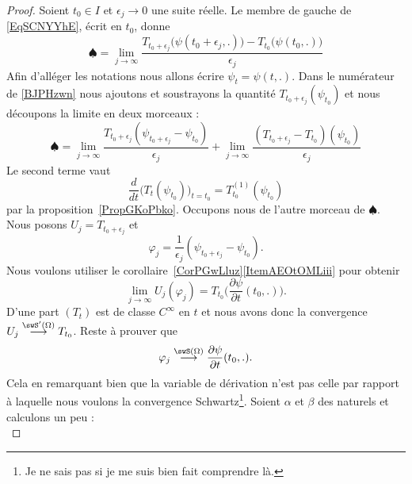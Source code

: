 \begin{proof}
    Soient \( t_0\in I\) et \( \epsilon_j\to 0\) une suite réelle. Le membre de gauche de \eqref{EqSCNYYhE}, écrit en \( t_0\), donne
    \begin{equation}    \label{BJPHzwn}
        \spadesuit=\lim_{j\to \infty} \frac{ T_{t_0+\epsilon_j}\big( \psi(t_0+\epsilon_j,.) \big)-T_{t_0}\big( \psi(t_0,.) \big) }{ \epsilon_j }
    \end{equation}
    Afin d'alléger les notations nous allons écrire \( \psi_t=\psi(t,.)\). Dans le numérateur de \eqref{BJPHzwn} nous ajoutons et soustrayons la quantité \( T_{t_0+\epsilon_j}(\psi_{t_0})\) et nous découpons la limite en deux morceaux :
    \begin{equation}
        \spadesuit=\lim_{j\to \infty} \frac{ T_{t_0+\epsilon_j}(\psi_{t_0+\epsilon_j}-\psi_{t_0}) }{ \epsilon_j }+\lim_{j\to \infty} \frac{ (T_{t_0+\epsilon_j}-T_{t_0})(\psi_{t_0}) }{ \epsilon_j }
    \end{equation}
    Le second terme vaut
    \begin{equation}
        \frac{ d }{ dt }\Big( T_t(\psi_{t_0}) \Big)_{t=t_0}=T_{t_0}^{(1)}(\psi_{t_0})
    \end{equation}
    par la proposition~\ref{PropGKoPbko}. Occupons nous de l'autre morceau de \( \spadesuit\). Nous posons \( U_j=T_{t_0+\epsilon_j}\) et
    \begin{equation}
        \varphi_j=\frac{1}{ \epsilon_j }(\psi_{t_0+\epsilon_j}-\psi_{t_0}).
    \end{equation}
    Nous voulons utiliser le corollaire~\ref{CorPGwLluz}\ref{ItemAEOtOMLiii} pour obtenir
    \begin{equation}
        \lim_{j\to \infty} U_j(\varphi_j)=T_{t_0}\Big( \frac{ \partial \psi }{ \partial t }(t_0,.) \Big).
    \end{equation}
    D'une part \( (T_t)\) est de classe \(  C^{\infty}\) en \( t\) et nous avons donc la convergence \( U_j\stackrel{\swS'(\Omega)}{\longrightarrow}T_{t_0}\). Reste à prouver que
    \begin{equation}
        \varphi_j\stackrel{\swS(\Omega)}{\longrightarrow}\frac{ \partial \psi }{ \partial t }(t_0,.).
    \end{equation}
    Cela en remarquant bien que la variable de dérivation n'est pas celle par rapport à laquelle nous voulons la convergence Schwartz\footnote{Je ne sais pas si je me suis bien fait comprendre là.}. Soient \( \alpha\) et \( \beta\) des naturels et calculons un peu :
    \begin{equation}    \label{EqEBUYDRA}

\end{equation}
\end{proof}
